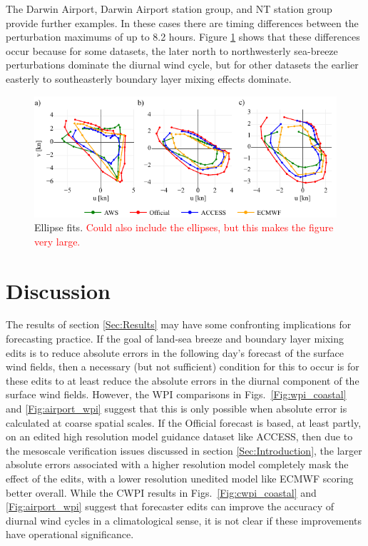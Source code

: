 \documentclass{ametsoc}
\begin{document}
The Darwin Airport, Darwin Airport station group, and NT station group provide further examples. In these cases there are timing differences between the perturbation maximums of up to 8.2 hours. Figure \ref{Fig:nt_ellipse_hodo} shows that these differences occur because for some datasets, the later north to northwesterly sea-breeze perturbations dominate the diurnal wind cycle, but for other datasets the earlier easterly to southeasterly boundary layer mixing effects dominate. 

\begin{figure}
\centering
\includegraphics[width=39pc]{nt_ellipse_hodo.pdf}
\caption{Ellipse fits. \textcolor{red}{Could also include the ellipses, but this makes the figure very large.}}
\label{Fig:nt_ellipse_hodo}
\end{figure}

\section{Discussion}
\label{Sec:Discussion}
The results of section \ref{Sec:Results} may have some confronting implications for forecasting practice. If the goal of land-sea breeze and boundary layer mixing edits is to reduce absolute errors in the following day's forecast of the surface wind fields, then a necessary (but not sufficient) condition for this to occur is for these edits to at least reduce the absolute errors in the diurnal component of the surface wind fields. However, the WPI comparisons in Figs.~\ref{Fig:wpi_coastal} and \ref{Fig:airport_wpi} suggest that this is only possible when absolute error is calculated at coarse spatial scales. If the Official forecast is based, at least partly, on an edited high resolution model guidance dataset like ACCESS, then due to the mesoscale verification issues discussed in section \ref{Sec:Introduction}, the larger absolute errors associated with a higher resolution model completely mask the effect of the edits, with a lower resolution unedited model like ECMWF scoring better overall. While the CWPI results in Figs.~\ref{Fig:cwpi_coastal} and \ref{Fig:airport_wpi} suggest that forecaster edits can improve the accuracy of diurnal wind cycles in a climatological sense, it is not clear if these improvements have operational significance. 
\end{document}

